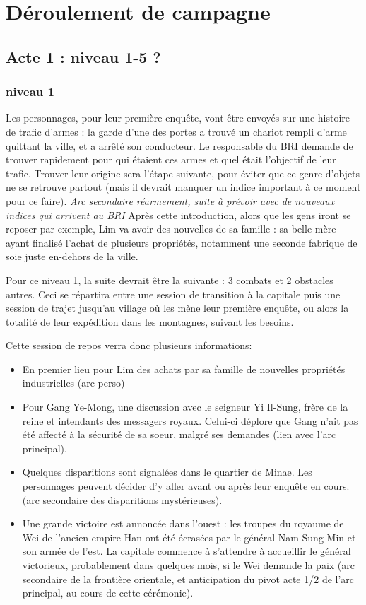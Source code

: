 \documentclass[10pt,a4paper]{book}
\begin{document}
\chapter{Déroulement de campagne}
\section{Acte 1 : niveau 1-5 ?}
\subsection{niveau 1}
Les personnages, pour leur première enquête, vont être envoyés sur une histoire de trafic d'armes : la garde d'une des portes a trouvé un chariot rempli d'arme quittant la ville, et a arrêté son conducteur. Le responsable du BRI demande de trouver rapidement pour qui étaient ces armes et quel était l'objectif de leur trafic. Trouver leur origine sera l'étape suivante, pour éviter que ce genre d'objets ne se retrouve partout (mais il devrait manquer un indice important à ce moment pour ce faire). 
\emph{Arc secondaire réarmement, suite à prévoir avec de nouveaux indices qui arrivent au BRI}
Après cette introduction, alors que les gens iront se reposer par exemple, Lim va avoir des nouvelles de sa famille : sa belle-mère ayant finalisé l'achat de plusieurs propriétés, notamment une seconde fabrique de soie juste en-dehors de la ville. 

Pour ce niveau 1, la suite devrait être la suivante : 3 combats et 2 obstacles autres. Ceci se répartira entre une session de transition à la capitale puis une session de trajet jusqu'au village où les mène leur première enquête, ou alors la totalité de leur expédition dans les montagnes, suivant les besoins.

Cette session de repos verra donc plusieurs informations:
\begin{itemize}
\item En premier lieu pour Lim des achats par sa famille de nouvelles propriétés industrielles (arc perso)
\item Pour Gang Ye-Mong, une discussion avec le seigneur Yi Il-Sung, frère de la reine et intendants des messagers royaux. Celui-ci déplore que Gang n'ait pas été affecté à la sécurité de sa soeur, malgré ses demandes (lien avec l'arc principal).
\item Quelques disparitions sont signalées dans le quartier de Minae. Les personnages peuvent décider d'y aller avant ou après leur enquête en cours. (arc secondaire des disparitions mystérieuses).
\item Une grande victoire est annoncée dans l'ouest : les troupes du royaume de Wei de l'ancien empire Han ont été écrasées par le général Nam Sung-Min et son armée de l'est. La capitale commence à s'attendre à accueillir le général victorieux, probablement dans quelques mois, si le Wei demande la paix (arc secondaire de la frontière orientale, et anticipation du pivot acte 1/2 de l'arc principal, au cours de cette cérémonie).
\end{itemize}
\end{document}
